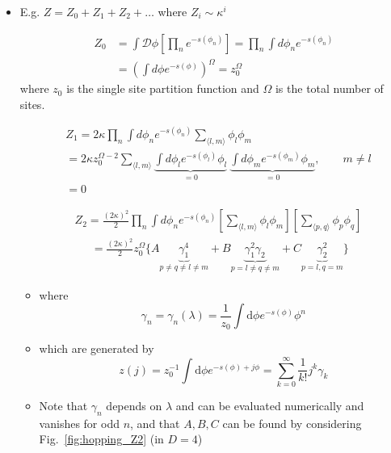 \begin{itemize}
\item E.g. $Z = Z_0 + Z_1 + Z_2 + \ldots$ where $Z_i\sim \kappa^i$


\begin{equation}
\begin{aligned}
Z_{0} & =\int \mathcal{D} \phi\left[\prod_{n} e^{-s\left(\phi_{n}\right)} \right]=\prod_{n} \int d \phi_{n} e^{-s\left(\phi_{n}\right)} \\
& =\left(\int d \phi e^{-s(\phi)}\right)^{\Omega}=z_{0}^{\Omega} 
\end{aligned}
\end{equation}
where $z_0$ is the single site partition function and $\Omega$ is the total number of sites.

\begin{equation}
\begin{aligned}
& Z_{1}=2 \kappa \prod_{n} \int d \phi_{n} e^{-s\left(\phi_{n}\right)} \sum_{\langle l, m\rangle} \phi_{l} \phi_{m} \\
& =2 \kappa z_{0}^{\Omega - 2} \sum_{\langle l, m\rangle}\underbrace{\int d \phi_{l} e^{-s\left(\phi_{l}\right)} \phi_{l}}_{=0}\ \underbrace{\int d \phi_{m} e^{-s\left(\phi_{m}\right)} \phi_{m}}_{=0}, \qquad m \neq l \\
& =0
\end{aligned}
\end{equation}

\begin{equation}
\begin{aligned}
& Z_{2}=\frac{(2 \kappa)^{2}}{2} \prod_{n} \int d \phi_{n} e^{-s\left(\phi_{n}\right)}\left[\sum_{\langle l, m\rangle} \phi_{l} \phi_{m}\right]\left[\sum_{\langle p,q \rangle} \phi_{p} \phi_{q}\right] \\
&\quad \; \,= \frac{(2\kappa)^2}{2}z_0^\Omega \{ A \underbrace{\gamma_1^4}_{p \neq q \neq l \neq m} + B \underbrace{\gamma_1^2 \gamma_2}_{p = l \neq q \neq m} + C \underbrace{\gamma_2^2}_{p=l, q = m} \}
\end{aligned}
\end{equation}

\begin{itemize}
    \item where 
    \begin{equation}
        \gamma_n = \gamma_n(\lambda) = \frac{1}{z_0} \int \text{d}\phi e^{-s(\phi)}\phi^n
    \end{equation}
    \item which are generated by 
    \begin{equation}
        z(j) = z_0^{-1}\int \text{d}\phi e^{-s(\phi) + j \phi} = \sum_{k=0}^\infty \frac{1}{k!} j^k \gamma_k
    \end{equation}
    \item Note that $\gamma_n$ depends on $\lambda$ and can be evaluated numerically and vanishes for odd $n$, and that $A, B, C$ can be found by considering Fig.~\ref{fig:hopping_Z2} (in $D=4$)
\end{itemize}


\end{itemize}
